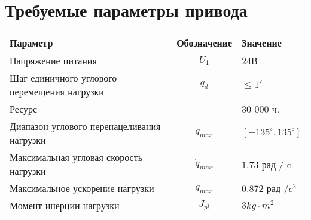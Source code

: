 \section{Требуемые параметры привода}

\begin{tabular}{|l|c|l|}
\hline
Параметр                                    & Обозначение      & Значение \\
\hline
Напряжение питания                          & $U_1$            & 24В \\
Шаг единичного углового перемещения нагрузки& $q_d$            & $ \le 1' $ \\
Ресурс                                      &                  & 30 000 ч. \\
Диапазон углового перенацеливания нагрузки  & $q_{max}$        & $[-135^\circ, 135^\circ] $\\
Максимальная угловая скорость нагрузки      & $\dot{q}_{max}$  & $1.73$ рад / c \\
Максимальное ускорение нагрузки             & $\ddot{q}_{max}$ & $0.872$ рад /$c^2$ \\
Момент инерции нагрузки                     & $J_{pl}$         & $3 kg \cdot m^2 $\\
\hline
\end{tabular}

\endinput

